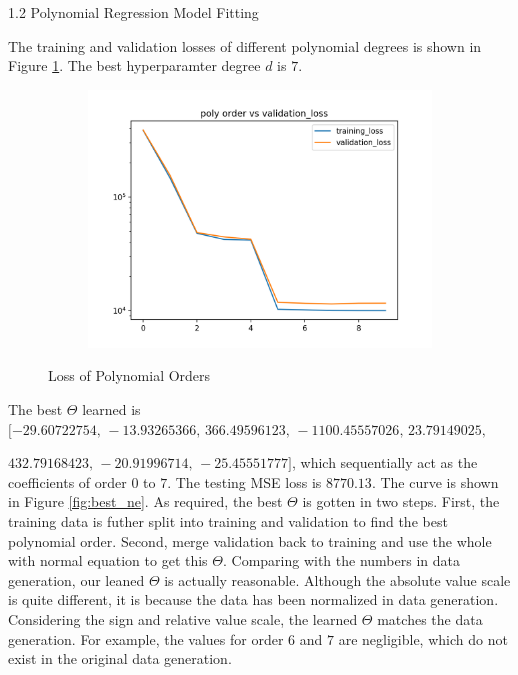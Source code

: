 \documentclass[11pt]{article}
\begin{document}
\begin{enumerate}
1.2 Polynomial Regression Model Fitting

\medskip

The training and validation losses of different polynomial degrees is shown in Figure \ref{fig:poly_order_loss}. The best hyperparamter degree $d$ is $7$.


\begin{figure}[!h]
  \centering
  \begin{subfigure}[b]{0.4\linewidth}
    \includegraphics[width=\linewidth]{figures/poly_order_loss.png}
  \end{subfigure}
  \caption{Loss of Polynomial Orders}
  \label{fig:poly_order_loss}
\end{figure}

\medskip

The best $\Theta$ learned is $[-29.60722754,\, -13.93265366,\, 366.49596123,\, -1100.45557026,\, 23.79149025,\,$

$432.79168423,\, -20.91996714,\, -25.45551777]$, which sequentially act as the coefficients of order $0$ to $7$. The testing MSE loss is $8770.13$. The curve is shown in Figure \ref{fig:best_ne}. As required, the best $\Theta$ is gotten in two steps. First, the training data is futher split into training and validation to find the best polynomial order. Second, merge validation back to training and use the whole with normal equation to get this $\Theta$. Comparing with the numbers in data generation, our leaned $\Theta$ is actually reasonable. Although the absolute value scale is quite different, it is because the data has been normalized in data generation. Considering the sign and relative value scale, the learned $\Theta$ matches the data generation. For example, the values for order $6$ and $7$ are negligible, which do not exist in the original data generation.


\end{enumerate}
\end{document}
